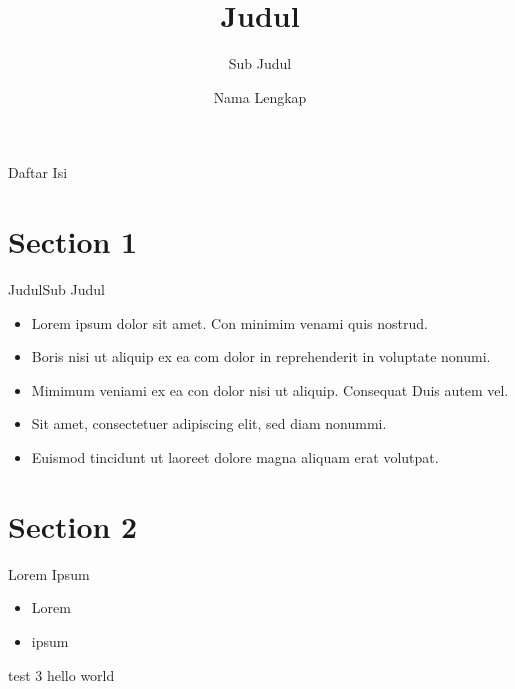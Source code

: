 \documentclass[aspectratio=169]{beamer}
\title{Judul}
\subtitle{Sub Judul}
\author{Nama Lengkap}
\begin{document}
\begin{frame}[plain]
  \titlepage
\end{frame}

\begin{frame}{Daftar Isi}
  \tableofcontents
\end{frame}


\section{Section 1}

\begin{frame}{Judul}{Sub Judul}
  \begin{itemize}
    \item Lorem ipsum dolor sit amet. Con minimim venami quis nostrud.
    \item Boris nisi ut aliquip ex ea com dolor in reprehenderit in voluptate nonumi.
    \item Mimimum veniami ex ea con dolor nisi ut aliquip. Consequat Duis autem vel.
    \item Sit amet, consectetuer adipiscing elit, sed diam nonummi.
    \item Euismod tincidunt ut laoreet dolore magna aliquam erat volutpat.
  \end{itemize}
\end{frame}

\section{Section 2}
\begin{frame}{Lorem Ipsum}{}
  \begin{itemize}
    \item Lorem
    \item ipsum
  \end{itemize}
\end{frame}

\begin{frame}{test 3}{}
  hello world
\end{frame}
\end{document}
